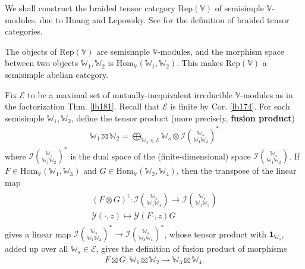\documentclass[11pt,b5paper,notitlepage]{article}
\theoremstyle{definition}
\theoremstyle{plain}
\newcommand{\mc}{\mathcal}
\newcommand{\wtd}{\widetilde}
\newcommand{\tr}{\mathrm{t}} %
\newcommand{\id}{\mathbf{1}}
\newcommand{\Hom}{\mathrm{Hom}}
\newcommand{\Rep}{\mathrm{Rep}}
\newcommand{\Vbb}{\mathbb V}
\newcommand{\Wbb}{\mathbb W}
\numberwithin{equation}{section}
\begin{document}

We shall construct the braided tensor category $\Rep(\Vbb)$ of semisimple $\Vbb$-modules, due to Huang and Lepowsky. See \cite{BK,EGNO} for the definition of braided tensor categories.   





The objects of $\Rep(\Vbb)$ are semisimple $\Vbb$-modules, and the morphism space between two objects $\Wbb_1,\Wbb_2$ is $\Hom_\Vbb(\Wbb_1,\Wbb_2)$. This makes $\Rep(\Vbb)$ a semisimple abelian category.

Fix $\mc E$ to be a maximal set of mutually-inequivalent irreducible $\Vbb$-modules as in the factorization Thm. \ref{lb181}. Recall that $\mc E$ is finite by Cor. \ref{lb174}. For each semisimple $\Wbb_1,\Wbb_2$, define the tensor product (more precisely, \textbf{fusion product})
\begin{align}
\Wbb_1\boxtimes\Wbb_2=\bigoplus_{\Wbb_s\in\mc E}\Wbb_s\otimes\mc I{\Wbb_s\choose \Wbb_1\Wbb_2}^*
\end{align}
where $\mc I{\Wbb_s\choose \Wbb_1\Wbb_2}^*$ is the dual space of the (finite-dimensional) space $\mc I{\Wbb_s\choose \Wbb_1\Wbb_2}$. If $F\in\Hom_\Vbb(\Wbb_1,\Wbb_3)$ and $G\in\Hom_\Vbb(\Wbb_2,\Wbb_4)$, then the transpose of the linear map
\begin{gather}
\begin{gathered}
(F\otimes G)^\tr:\mc I{\Wbb_s\choose \Wbb_3\Wbb_4}\rightarrow \mc I{\Wbb_s\choose \Wbb_1\Wbb_2}\\
\mc Y(\cdot,z)\mapsto\mc Y(F\cdot,z)G 
\end{gathered}
\end{gather}
gives a linear map $\mc I{\Wbb_s\choose \Wbb_1\Wbb_2}^*\rightarrow \mc I{\Wbb_s\choose \Wbb_3\Wbb_4}^*$, whose tensor product with $\id_{\Wbb_s}$, added up over all $\Wbb_s\in\mc E$, gives the definition of fusion product of morphisms
\begin{align}
F\boxtimes G:\Wbb_1\boxtimes\Wbb_2\rightarrow\Wbb_3\boxtimes\Wbb_4.
\end{align}

\subsection{}
\end{document}
